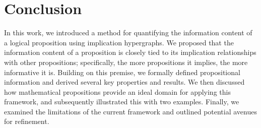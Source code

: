 \documentclass[11pt]{article}
\theoremstyle{definition}
\theoremstyle{plain}
\theoremstyle{remark}
\begin{document}
\section{Conclusion}
In this work, we introduced a method for quantifying the information content of a logical proposition using implication hypergraphs. We proposed that the information content of a proposition is closely tied to its implication relationships with other propositions; specifically, the more propositions it implies, the more informative it is. Building on this premise, we formally defined propositional information and derived several key properties and results. We then discussed how mathematical propositions provide an ideal domain for applying this framework, and subsequently illustrated this with two examples. Finally, we examined the limitations of the current framework and outlined potential avenues for refinement.




\end{document}

